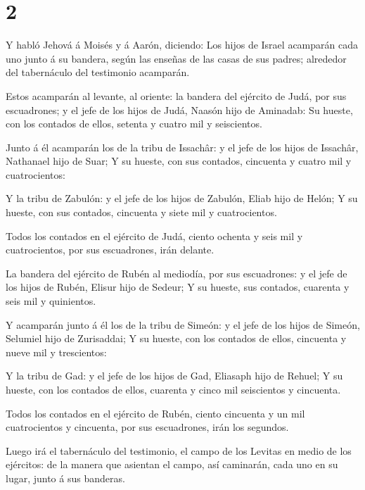 \hypertarget{section-1}{%
\section{2}\label{section-1}}

 Y habló Jehová á Moisés y á Aarón, diciendo: 
Los hijos de Israel acamparán cada uno junto á su bandera, según las
enseñas de las casas de sus padres; alrededor del tabernáculo del
testimonio acamparán.

 Estos acamparán al levante, al oriente: la bandera del
ejército de Judá, por sus escuadrones; y el jefe de los hijos de Judá,
Naasón hijo de Aminadab:  Su hueste, con los contados de
ellos, setenta y cuatro mil y seiscientos.

 Junto á él acamparán los de la tribu de Issachâr: y el jefe
de los hijos de Issachâr, Nathanael hijo de Suar;  Y su
hueste, con sus contados, cincuenta y cuatro mil y cuatrocientos:

 Y la tribu de Zabulón: y el jefe de los hijos de Zabulón,
Eliab hijo de Helón;  Y su hueste, con sus contados,
cincuenta y siete mil y cuatrocientos.

 Todos los contados en el ejército de Judá, ciento ochenta y
seis mil y cuatrocientos, por sus escuadrones, irán delante.

 La bandera del ejército de Rubén al mediodía, por sus
escuadrones: y el jefe de los hijos de Rubén, Elisur hijo de Sedeur;
 Y su hueste, sus contados, cuarenta y seis mil y
quinientos.

 Y acamparán junto á él los de la tribu de Simeón: y el
jefe de los hijos de Simeón, Selumiel hijo de Zurisaddai; 
Y su hueste, con los contados de ellos, cincuenta y nueve mil y
trescientos:

 Y la tribu de Gad: y el jefe de los hijos de Gad, Eliasaph
hijo de Rehuel;  Y su hueste, con los contados de ellos,
cuarenta y cinco mil seiscientos y cincuenta.

 Todos los contados en el ejército de Rubén, ciento
cincuenta y un mil cuatrocientos y cincuenta, por sus escuadrones, irán
los segundos.

 Luego irá el tabernáculo del testimonio, el campo de los
Levitas en medio de los ejércitos: de la manera que asientan el campo,
así caminarán, cada uno en su lugar, junto á sus banderas.

